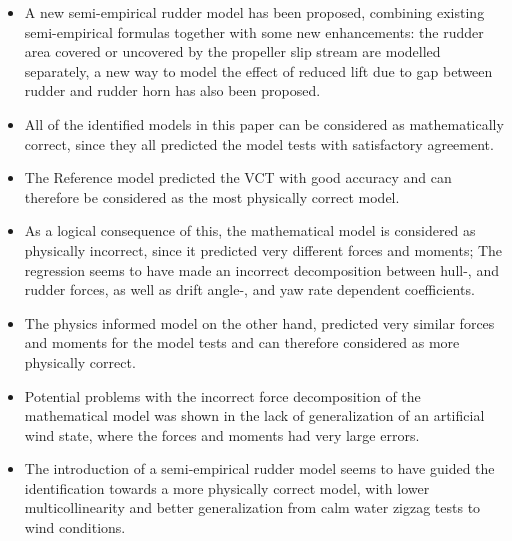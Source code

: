 \begin{itemize}
    \item A new semi-empirical rudder model has been proposed, combining existing semi-empirical formulas together with some new enhancements: the rudder area covered or uncovered by the propeller slip stream are modelled separately, a new way to model the effect of reduced lift due to gap between rudder and rudder horn has also been proposed.     

    \item All of the identified models in this paper can be considered as mathematically correct, since they all predicted the model tests with satisfactory agreement.
    
    \item The Reference model predicted the VCT with good accuracy and can therefore be considered as the most physically correct model.   
    \item As a logical consequence of this, the mathematical model is considered as physically incorrect, since it predicted very different forces and moments; The regression seems to have made an incorrect decomposition between hull-, and rudder forces, as well as drift angle-, and yaw rate dependent coefficients.  
    \item The physics informed model on the other hand, predicted very similar forces and moments for the model tests and can therefore considered as more physically correct.
    \item Potential problems with the incorrect force decomposition of the mathematical model was shown in the lack of generalization of an artificial wind state, where the forces and moments had very large errors. 
    \item The introduction of a semi-empirical rudder model seems to have guided the identification towards a more physically correct model, with lower multicollinearity and better generalization from calm water zigzag tests to wind conditions. 
\end{itemize}